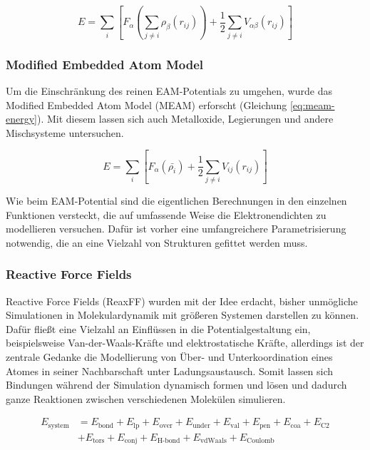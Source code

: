 \begin{equation}
  \label{eq:eam-energy}
  E = \sum_i\left[F_\alpha\left(\sum_{j\neq i}{\rho_\beta\left(r_{ij}\right)}\right) + \frac{1}{2}\sum_{j\neq i}{V_{\alpha\beta}\left(r_{ij}\right)}\right]
\end{equation}

\subsubsection{Modified Embedded Atom Model}

Um die Einschränkung des reinen EAM-Potentials zu umgehen, wurde das Modified Embedded Atom Model (MEAM) erforscht (Gleichung \ref{eq:meam-energy}). 
Mit diesem lassen sich auch Metalloxide, Legierungen und andere Mischsysteme untersuchen.


\begin{equation}
  \label{eq:meam-energy}
  E = \sum_i\left[F_\alpha\left(\bar{\rho_i}\right) + \frac{1}{2}\sum_{j\neq i}{V_{ij}\left(r_{ij}\right)}\right]
\end{equation}

Wie beim EAM-Potential sind die eigentlichen Berechnungen in den einzelnen Funktionen versteckt, die auf umfassende Weise die Elektronendichten zu modellieren versuchen.
Dafür ist vorher eine umfangreichere Parametrisierung notwendig, die an eine Vielzahl von Strukturen gefittet werden muss.

\subsubsection{Reactive Force Fields}

Reactive Force Fields (ReaxFF) wurden mit der Idee erdacht, bisher unmögliche Simulationen in Molekulardynamik mit größeren Systemen darstellen zu können.
Dafür fließt eine Vielzahl an Einflüssen in die Potentialgestaltung ein, beispielsweise Van-der-Waals-Kräfte und elektrostatische Kräfte, allerdings ist der zentrale Gedanke die Modellierung von Über- und Unterkoordination eines Atomes in seiner Nachbarschaft unter Ladungsaustausch.
Somit lassen sich Bindungen während der Simulation dynamisch formen und lösen und dadurch ganze Reaktionen zwischen verschiedenen Molekülen simulieren.

\begin{align}
  \label{eq:reax-formulation}
  E_\text{system} &= E_\text{bond} + E_\text{lp} + E_\text{over} + E_\text{under} + E_\text{val} + E_\text{pen} + E_\text{coa} + E_\text{C2} \\
  \nonumber  & + E_\text{tors} + E_\text{conj} + E_\text{H-bond} + E_\text{vdWaals} + E_\text{Coulomb}
\end{align}

